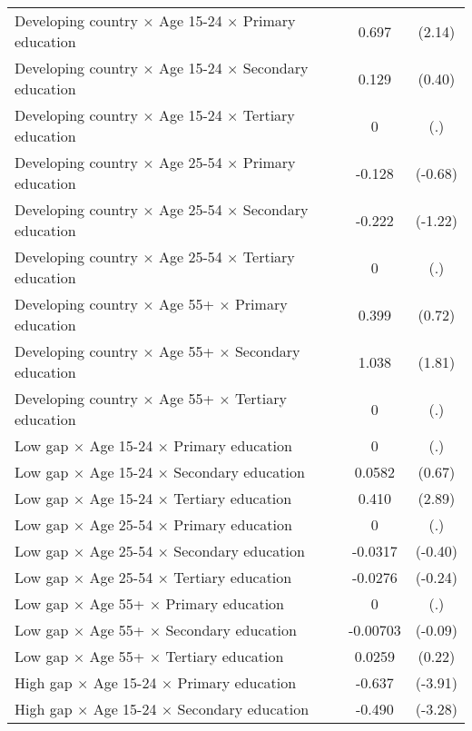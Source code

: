 {\begin{longtable}{l*{1}{cc}}
Developing country $\times$ Age 15-24 $\times$ Primary education&       0.697\sym{*}  &      (2.14)\\
Developing country $\times$ Age 15-24 $\times$ Secondary education&       0.129         &      (0.40)\\
Developing country $\times$ Age 15-24 $\times$ Tertiary education&           0         &         (.)\\
Developing country $\times$ Age 25-54 $\times$ Primary education&      -0.128         &     (-0.68)\\
Developing country $\times$ Age 25-54 $\times$ Secondary education&      -0.222         &     (-1.22)\\
Developing country $\times$ Age 25-54 $\times$ Tertiary education&           0         &         (.)\\
Developing country $\times$ Age 55+ $\times$ Primary education&       0.399         &      (0.72)\\
Developing country $\times$ Age 55+ $\times$ Secondary education&       1.038         &      (1.81)\\
Developing country $\times$ Age 55+ $\times$ Tertiary education&           0         &         (.)\\
Low gap $\times$ Age 15-24 $\times$ Primary education&           0         &         (.)\\
Low gap $\times$ Age 15-24 $\times$ Secondary education&      0.0582         &      (0.67)\\
Low gap $\times$ Age 15-24 $\times$ Tertiary education&       0.410\sym{**} &      (2.89)\\
Low gap $\times$ Age 25-54 $\times$ Primary education&           0         &         (.)\\
Low gap $\times$ Age 25-54 $\times$ Secondary education&     -0.0317         &     (-0.40)\\
Low gap $\times$ Age 25-54 $\times$ Tertiary education&     -0.0276         &     (-0.24)\\
Low gap $\times$ Age 55+ $\times$ Primary education&           0         &         (.)\\
Low gap $\times$ Age 55+ $\times$ Secondary education&    -0.00703         &     (-0.09)\\
Low gap $\times$ Age 55+ $\times$ Tertiary education&      0.0259         &      (0.22)\\
High gap $\times$ Age 15-24 $\times$ Primary education&      -0.637\sym{***}&     (-3.91)\\
High gap $\times$ Age 15-24 $\times$ Secondary education&      -0.490\sym{**} &     (-3.28)\\

\end{longtable}}
